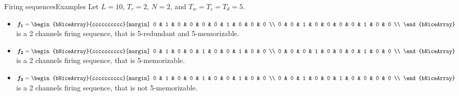 \documentclass{beamer}
\begin{document}

	\begin{frame}{Firing sequences}{Examples}
		\justifying
		Let $L = 10$, $T_r = 2$, $N = 2$, and $T_w = T_c = T_d = 5$.
		\begin{itemize}
			\justifying
			\item 
				$\mat{f_1} = 
				\begin{bNiceArray}{cccccccccc}[margin] 
					0 & 1 & 0 & 0 & 0 & 0 & 1 & 0 & 0 & 0 \\ 
					0 & 0 & 1 & 0 & 0 & 0 & 0 & 1 & 0 & 0 \\ 
				\end{bNiceArray}$
			is a 2 channels firing sequence, that is 5-redundant and 5-memorizable. 
			\item
			$\mat{f_2} = 
			\begin{bNiceArray}{cccccccccc}[margin] 
				0 & 1 & 0 & 0 & 1 & 0 & 0 & 1 & 0 & 0 \\ 
				0 & 0 & 0 & 1 & 0 & 0 & 0 & 1 & 0 & 0 \\ 
			\end{bNiceArray}$
			is a 2 channels firing sequence, that is 5-memorizable. 
			\item
			$\mat{f_3} = 
			\begin{bNiceArray}{cccccccccc}[margin] 
				0 & 1 & 0 & 0 & 1 & 0 & 0 & 1 & 0 & 0 \\ 
				0 & 0 & 1 & 0 & 0 & 1 & 0 & 0 & 0 & 0 \\ 
			\end{bNiceArray}$
			is a 2 channels firing sequence, that is not 5-memorizable. 
		\end{itemize}


	\end{frame}
\end{document}

